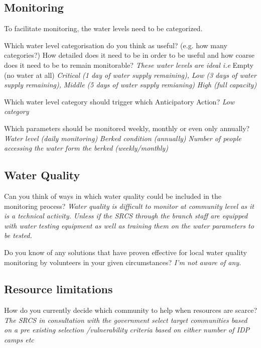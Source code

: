\subsection*{Monitoring}
To facilitate monitoring, the water levels need to be categorized.  

Which water level categorisation do you think as useful? (e.g. how many categories?) How detailed does it need to be in order to be useful and how coarse does it need to be to remain monitorable?  
\textit{These water levels are ideal i.e }\newline
Empty (no water at all) \newline
\textit{Critical (1 day of water supply remaining),}\newline
\textit{Low (3 days of water supply remaining),} \newline
\textit{Middle (5 days of water supply remianing)}\newline
\textit{High (full capacity)}

Which water level category should trigger which Anticipatory Action?  
\textit{Low category}\newline

Which parameters should be monitored weekly, monthly or even only annually?  
\textit{Water level (daily monitoring)}\newline
\textit{Berked condition (annually)}\newline
\textit{Number of people accessing the water form the berked (weekly/monthly)}


\subsection*{Water Quality}
Can you think of ways in which water quality could be included in the monitoring process? \newline
\textit{Water quality is difficult to monitor at community level as it is a technical activity. Unless if the SRCS through the branch staff are equipped with water testing equipment as well as training them on the water parameters to be tested.}

Do you know of any solutions that have proven effective for local water quality monitoring by volunteers in your given circumstances?  
\textit{I'm not aware of any.}

\subsection*{Resource limitations}
How do you currently decide which community to help when resources are scarce?\newline
\textit{The SRCS in consultation with the government select target communities based on a pre existing selection /vulnerability criteria based on either number of IDP camps etc}

